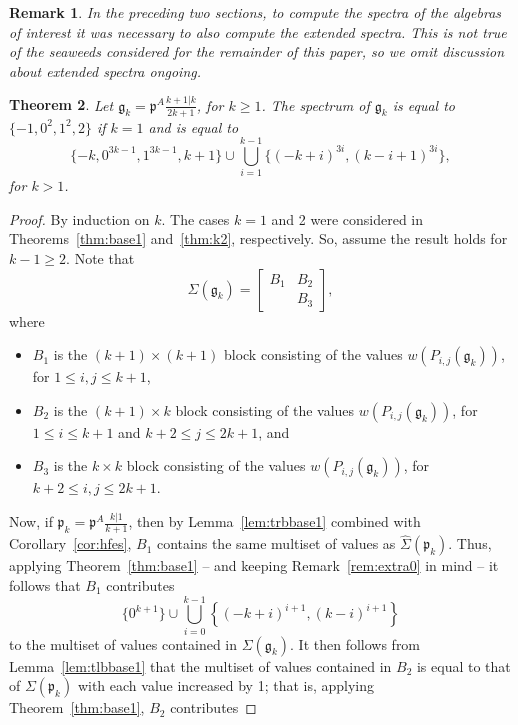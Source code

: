 \documentclass[letterpaper,10pt]{article}
\newtheorem{theorem}{Theorem}
\newtheorem{remark}[theorem]{Remark}
\begin{document}
\begin{remark}
    In the preceding two sections, to compute the spectra of the algebras of interest it was necessary to also compute the extended spectra. This is not true of the seaweeds considered for the remainder of this paper, so we omit discussion about extended spectra ongoing.
\end{remark}

\begin{theorem}\label{thm:k1k}
Let $\mathfrak{g}_k=\mathfrak{p}^A\frac{k+1|k}{2k+1}$, for $k\ge 1$. The spectrum of $\mathfrak{g}_k$ is equal to $\{-1,0^2,1^2,2\}$ if $k=1$ and is equal to $$\{-k,0^{3k-1},1^{3k-1},k+1\}\cup\bigcup_{i=1}^{k-1}\{(-k+i)^{3i},(k-i+1)^{3i}\},$$ for $k>1$.
\end{theorem}
\begin{proof}
By induction on $k$. The cases $k=1$ and 2 were considered in Theorems~\ref{thm:base1} and~\ref{thm:k2}, respectively. So, assume the result holds for $k-1\geq 2$. Note that $$\Sigma(\mathfrak{g}_k)=\begin{bmatrix} B_1 & B_2 \\  & B_3 \end{bmatrix},$$ where 
\begin{itemize}
    \item $B_1$ is the $(k+1)\times (k+1)$ block consisting of the values $w(P_{i,j}(\mathfrak{g}_k))$, for $1\le i,j\le k+1$,
    \item $B_2$ is the $(k+1)\times k$ block consisting of the values $w(P_{i,j}(\mathfrak{g}_k))$, for $1\le i\le k+1$ and $k+2\le j\le 2k+1$, and
    \item $B_3$ is the $k\times k$ block consisting of the values $w(P_{i,j}(\mathfrak{g}_k))$, for $k+2\le i,j\le 2k+1$.
\end{itemize}
Now, if  $\mathfrak{p}_k=\mathfrak{p}^A\frac{k|1}{k+1}$, then by Lemma~\ref{lem:trbbase1} combined with Corollary~\ref{cor:hfes}, $B_1$ contains the same multiset of values as $\widehat{\Sigma}(\mathfrak{p}_k)$. Thus, applying Theorem~\ref{thm:base1} -- and keeping Remark~\ref{rem:extra0} in mind -- it follows that $B_1$ contributes 
\begin{equation}\label{eq:k1kB1}
    \{0^{k+1}\}\cup\bigcup_{i=0}^{k-1}\left\{(-k+i)^{i+1},(k-i)^{i+1}\right\}
\end{equation}
to the multiset of values contained in $\Sigma(\mathfrak{g}_k)$. It then follows from Lemma~\ref{lem:tlbbase1} that the multiset of values contained in $B_2$ is equal to that of $\Sigma(\mathfrak{p}_k)$ with each value increased by 1; that is, applying Theorem~\ref{thm:base1}, $B_2$ contributes 

\end{proof}
\end{document}
